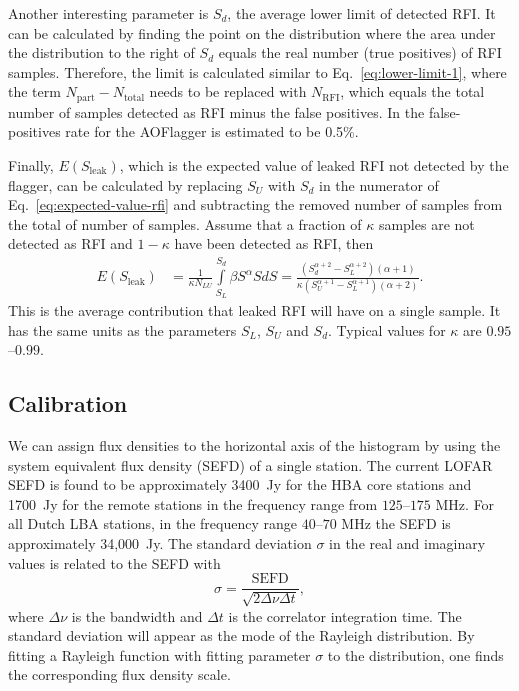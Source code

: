 \documentclass[useAMS,usenatbib]{mn2e}
\begin{document}
Another interesting parameter is $S_d$, the average lower limit of detected RFI. It can be calculated by finding the point on the distribution where the area under the distribution to the right of $S_d$ equals the real number (true positives) of RFI samples. Therefore, the limit is calculated similar to Eq.~\eqref{eq:lower-limit-1}, where the term $N_\textrm{part} - N_\textrm{total}$ needs to be replaced with $N_\textrm{RFI}$, which equals the total number of samples detected as RFI minus the false positives. In \citet{lofar-radio-environment} the false-positives rate for the AOFlagger is estimated to be 0.5\%.

Finally, $E(S_\textrm{leak})$, which is the expected value of leaked RFI not detected by the flagger, can be calculated by replacing $S_U$ with $S_d$ in the numerator of Eq.~\eqref{eq:expected-value-rfi} and subtracting the removed number of samples from the total of number of samples. Assume that a fraction of $\kappa$ samples are not detected as RFI and $1-\kappa$ have been detected as RFI, then
\begin{align} \label{eq:expected-value-leaked-rfi}
E(S_\textrm{leak}) & = \frac{1}{\kappa N_{LU}}\int\limits_{S_L}^{S_d} \beta S^\alpha S dS
= \frac{\left( S_d^{\alpha+2} - S_L^{\alpha+2} \right) \left( \alpha+1 \right) } {\kappa \left( S_U^{\alpha+1} - S_L^{\alpha+1}\right) \left( \alpha+2 \right)}.
\end{align}
This is the average contribution that leaked RFI will have on a single sample. It has the same units as the parameters $S_L$, $S_U$ and $S_d$. Typical values for $\kappa$ are $0.95$--$0.99$.

\subsection{Calibration} \label{sec:calibration}
We can assign flux densities to the horizontal axis of the histogram by using the system equivalent flux density (SEFD) of a single station. The current LOFAR SEFD is found to be approximately 3400~Jy for the HBA core stations and 1700~Jy for the remote stations in the frequency range from $125$--$175$ MHz. For all Dutch LBA stations, in the frequency range $40$--$70$ MHz the SEFD is approximately 34,000~Jy. The standard deviation $\sigma$ in the real and imaginary values is related to the SEFD with %
\begin{equation}
 \sigma = \frac{\textrm{SEFD}}{\sqrt{2 \Delta \nu \Delta t}},
\end{equation}
where $\Delta \nu$ is the bandwidth and $\Delta t$ is the correlator integration time. The standard deviation will appear as the mode of the Rayleigh distribution. By fitting a Rayleigh function with fitting parameter $\sigma$ to the distribution, one finds the corresponding flux density scale.
\end{document}
